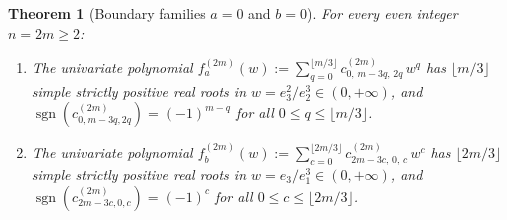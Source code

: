 \documentclass[10pt]{article}
\numberwithin{equation}{section}
\theoremstyle{plain}
\newtheorem{theorem}{Theorem}[section]
\theoremstyle{definition}
\newcommand{\1}{\mathbf{1}}
\DeclareMathOperator{\sgn}{sgn}
\begin{document}
\begin{theorem}[Boundary families $a = 0$ and $b = 0$]\label{thm:bdy-ab}
For every even integer $n = 2m \ge 2$:
\begin{enumerate}[label=\textup{(\arabic*)}]
    \item The univariate polynomial $f_a^{(2m)}(w) := \sum_{q=0}^{\lfloor m/3 \rfloor} c_{0,\, m-3q,\, 2q}^{(2m)}\, w^q$ has $\lfloor m/3 \rfloor$ simple strictly positive real roots in $w = e_3^2/e_2^3 \in (0, +\infty)$, and $\sgn(c_{0, m-3q, 2q}^{(2m)}) = (-1)^{m-q}$ for all $0 \le q \le \lfloor m/3 \rfloor$.
    \item The univariate polynomial $f_b^{(2m)}(w) := \sum_{c=0}^{\lfloor 2m/3 \rfloor} c_{2m-3c,\, 0,\, c}^{(2m)}\, w^c$ has $\lfloor 2m/3 \rfloor$ simple strictly positive real roots in $w = e_3/e_1^3 \in (0, +\infty)$, and $\sgn(c_{2m-3c, 0, c}^{(2m)}) = (-1)^c$ for all $0 \le c \le \lfloor 2m/3 \rfloor$.
\end{enumerate}
\end{theorem}
\end{document}
